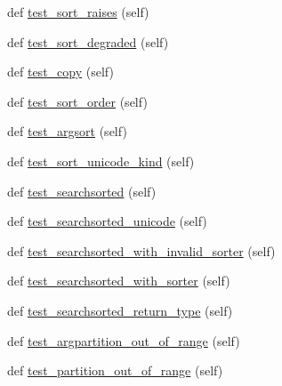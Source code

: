 \begin{DoxyCompactItemize}
\item 
def \hyperlink{classnumpy_1_1core_1_1tests_1_1test__multiarray_1_1TestMethods_afc59db5555430c27975f5fd7436c0c31}{test\+\_\+sort\+\_\+raises} (self)
\item 
def \hyperlink{classnumpy_1_1core_1_1tests_1_1test__multiarray_1_1TestMethods_a4e3f0485e928d25fd07398cf4ae3e479}{test\+\_\+sort\+\_\+degraded} (self)
\item 
def \hyperlink{classnumpy_1_1core_1_1tests_1_1test__multiarray_1_1TestMethods_a1bfabe9567115f02f578448243e935de}{test\+\_\+copy} (self)
\item 
def \hyperlink{classnumpy_1_1core_1_1tests_1_1test__multiarray_1_1TestMethods_ab898a94fbb3a82b236bf752d9c145d71}{test\+\_\+sort\+\_\+order} (self)
\item 
def \hyperlink{classnumpy_1_1core_1_1tests_1_1test__multiarray_1_1TestMethods_a7cb5a6d6f60121a57981f1e07298c02c}{test\+\_\+argsort} (self)
\item 
def \hyperlink{classnumpy_1_1core_1_1tests_1_1test__multiarray_1_1TestMethods_a5bfbfb75dea5450a0a34351cb01d5749}{test\+\_\+sort\+\_\+unicode\+\_\+kind} (self)
\item 
def \hyperlink{classnumpy_1_1core_1_1tests_1_1test__multiarray_1_1TestMethods_a952d1a5f35bfb6b44e4430e91a4e33be}{test\+\_\+searchsorted} (self)
\item 
def \hyperlink{classnumpy_1_1core_1_1tests_1_1test__multiarray_1_1TestMethods_a32b1a1331b35b80918610d2b64e5a227}{test\+\_\+searchsorted\+\_\+unicode} (self)
\item 
def \hyperlink{classnumpy_1_1core_1_1tests_1_1test__multiarray_1_1TestMethods_a685d9d51fa956f987cf711085e6a719d}{test\+\_\+searchsorted\+\_\+with\+\_\+invalid\+\_\+sorter} (self)
\item 
def \hyperlink{classnumpy_1_1core_1_1tests_1_1test__multiarray_1_1TestMethods_af2503ae1766e61fc495478d89afece01}{test\+\_\+searchsorted\+\_\+with\+\_\+sorter} (self)
\item 
def \hyperlink{classnumpy_1_1core_1_1tests_1_1test__multiarray_1_1TestMethods_af2236c6f41d2e97237545f4800c77807}{test\+\_\+searchsorted\+\_\+return\+\_\+type} (self)
\item 
def \hyperlink{classnumpy_1_1core_1_1tests_1_1test__multiarray_1_1TestMethods_a9159f840bd99657b78733ce0a6494285}{test\+\_\+argpartition\+\_\+out\+\_\+of\+\_\+range} (self)
\item 
def \hyperlink{classnumpy_1_1core_1_1tests_1_1test__multiarray_1_1TestMethods_ae0ff3f40ea01fef2709cb15f9e7d67a8}{test\+\_\+partition\+\_\+out\+\_\+of\+\_\+range} (self)

\end{DoxyCompactItemize}
